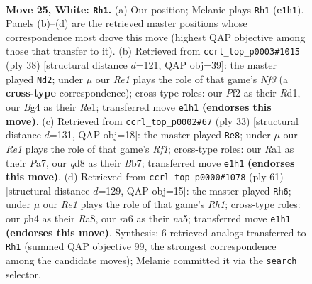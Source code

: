 \documentclass[11pt]{article}
\begin{document}
\clearpage

\begin{figure}[p]\centering
\begin{subfigure}{0.46\textwidth}\centering
\resizebox{\linewidth}{!}{%
\newchessgame
\chessboard[
  setfen={1n1qkbr1/1Q2n3/r1p3p1/p2p2P1/1p1P2Bp/1P5P/PBP1KP2/R2NR3 w - - 3 25},
  showmover=false,
  pgfstyle=straightmove, color=movearrow, markmove={e1-h1}
]}
\caption{}
\end{subfigure}\hfill
\begin{subfigure}{0.46\textwidth}\centering
\resizebox{\linewidth}{!}{%
\newchessgame
\chessboard[
  setfen={r3r1k1/1pp1q1pp/2nn1p2/p1Q5/4b3/PP2PNP1/1B3PBP/3RR1K1 w - - 1 20},
  showmover=false,
  pgfstyle=straightmove, color=movearrow, markmove={f3-d2}
]}
\caption{}
\end{subfigure}
\\[4pt]
\begin{subfigure}{0.46\textwidth}\centering
\resizebox{\linewidth}{!}{%
\newchessgame
\chessboard[
  setfen={5rk1/pbp2pp1/1pnb1n1p/3p4/3P4/P4NPq/1PQ1PP1P/R1BR1NK1 b - - 3 17},
  showmover=false,
  pgfstyle=straightmove, color=movearrow, markmove={f8-e8}
]}
\caption{}
\end{subfigure}\hfill
\begin{subfigure}{0.46\textwidth}\centering
\resizebox{\linewidth}{!}{%
\newchessgame
\chessboard[
  setfen={r4k1r/1bq1bpp1/p3p3/Np1pP2p/3P4/2PN4/1P3PP1/R2QR1K1 b - - 5 31},
  showmover=false,
  pgfstyle=straightmove, color=movearrow, markmove={h8-h6}
]}
\caption{}
\end{subfigure}
\caption{\textbf{Move 25, White: \texttt{Rh1}.} (a) Our position; Melanie plays \texttt{Rh1} (\texttt{e1h1}). Panels (b)--(d) are the retrieved master positions whose correspondence most drove this move (highest QAP objective among those that transfer to it). (b) Retrieved from \texttt{ccrl\_top\_p0003\#1015} (ply 38) [structural distance $d$=121, QAP obj=39]: the master played \texttt{Nd2}; under $\mu$ our \emph{Re1} plays the role of that game's \emph{Nf3} (a \textbf{cross-type} correspondence); cross-type roles: our \emph{P}f2 as their \emph{R}d1, our \emph{B}g4 as their \emph{R}e1; transferred move \texttt{e1h1} \textbf{(endorses this move)}. (c) Retrieved from \texttt{ccrl\_top\_p0002\#67} (ply 33) [structural distance $d$=131, QAP obj=18]: the master played \texttt{Re8}; under $\mu$ our \emph{Re1} plays the role of that game's \emph{Rf1}; cross-type roles: our \emph{R}a1 as their \emph{P}a7, our \emph{q}d8 as their \emph{B}b7; transferred move \texttt{e1h1} \textbf{(endorses this move)}. (d) Retrieved from \texttt{ccrl\_top\_p0000\#1078} (ply 61) [structural distance $d$=129, QAP obj=15]: the master played \texttt{Rh6}; under $\mu$ our \emph{Re1} plays the role of that game's \emph{Rh1}; cross-type roles: our \emph{p}h4 as their \emph{R}a8, our \emph{r}a6 as their \emph{n}a5; transferred move \texttt{e1h1} \textbf{(endorses this move)}. Synthesis: 6 retrieved analogs transferred to \texttt{Rh1} (summed QAP objective 99, the strongest correspondence among the candidate moves); Melanie committed it via the \texttt{search} selector.}
\label{fig:thought-m48}
\end{figure}
\end{document}
